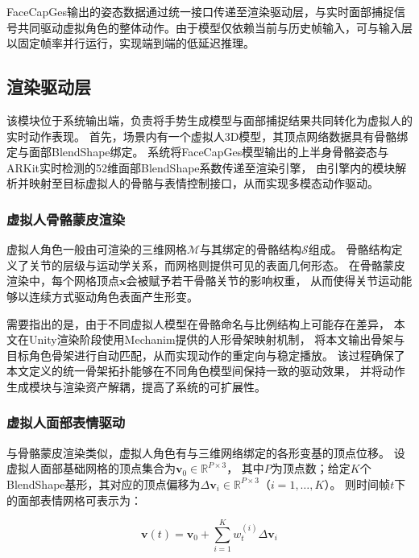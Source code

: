 FaceCapGes输出的姿态数据通过统一接口传递至渲染驱动层，与实时面部捕捉信号共同驱动虚拟角色的整体动作。由于模型仅依赖当前与历史帧输入，可与输入层以固定帧率并行运行，实现端到端的低延迟推理。

\subsection{渲染驱动层}

该模块位于系统输出端，负责将手势生成模型与面部捕捉结果共同转化为虚拟人的实时动作表现。
首先，场景内有一个虚拟人3D模型，其顶点网络数据具有骨骼绑定与面部BlendShape绑定。
系统将FaceCapGes模型输出的上半身骨骼姿态与ARKit实时检测的52维面部BlendShape系数传递至渲染引擎，
由引擎内的模块解析并映射至目标虚拟人的骨骼与表情控制接口，从而实现多模态动作驱动。

\subsubsection{虚拟人骨骼蒙皮渲染}
\label{subsec:skinning_and_retargeting}

虚拟人角色一般由可渲染的三维网格$\mathcal{M}$与其绑定的骨骼结构$\mathcal{S}$组成。
骨骼结构定义了关节的层级与运动学关系，而网格则提供可见的表面几何形态。
在骨骼蒙皮渲染中，每个网格顶点$\mathbf{x}$会被赋予若干骨骼关节的影响权重，
从而使得关节运动能够以连续方式驱动角色表面产生形变。

需要指出的是，由于不同虚拟人模型在骨骼命名与比例结构上可能存在差异，
本文在Unity\cite{unity}渲染阶段使用Mechanim提供的人形骨架映射机制\cite{unitymechanim}，
将本文输出骨架与目标角色骨架进行自动匹配，从而实现动作的重定向与稳定播放。
该过程确保了本文定义的统一骨架拓扑能够在不同角色模型间保持一致的驱动效果，
并将动作生成模块与渲染资产解耦，提高了系统的可扩展性。

\subsubsection{虚拟人面部表情驱动}

与骨骼蒙皮渲染类似，虚拟人角色有与三维网络绑定的各形变基的顶点位移。
设虚拟人面部基础网格的顶点集合为$\bm{v}_0 \in \mathbb{R}^{P \times 3}$，
其中$P$为顶点数；给定$K$个BlendShape基形，其对应的顶点偏移为$\Delta \bm{v}_i \in \mathbb{R}^{P \times 3}$（$i=1,\dots,K$）。
则时间帧$t$下的面部表情网格可表示为：

\begin{equation}
\bm{v}(t) = \bm{v}_0 + \sum_{i=1}^{K} w_t^{(i)}\Delta \bm{v}_i
\label{eq:blendshape}
\end{equation}

